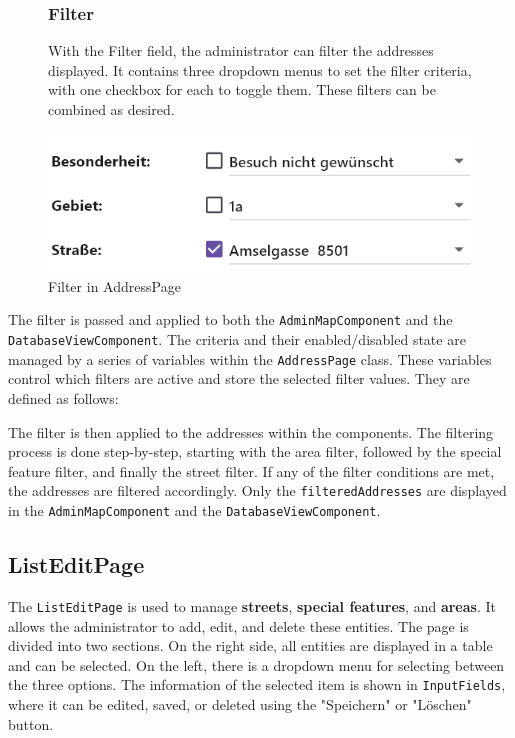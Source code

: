 \begin{figure}[H]
    \centering
    \begin{minipage}{0.55\textwidth} %
        \subsubsection{Filter}
        With the Filter field, the administrator can filter the addresses displayed. It contains three dropdown menus to set the filter criteria, with one checkbox for each to toggle them. These filters can be combined as desired. 
    \end{minipage}
    \hfill 
    \begin{minipage}{0.4\textwidth} %
        \centering
        \includegraphics[width=\linewidth]{images/AdminPanel/FilterField.png}
        \caption{Filter in AddressPage}
        \label{fig:adminpanel_filter}
    \end{minipage}
\end{figure}

\newpage

The filter is passed and applied to both the \texttt{AdminMapComponent} and the \texttt{DatabaseViewComponent}. The criteria and their enabled/disabled state are managed by a series of variables within the \texttt{AddressPage} class. These variables control which filters are active and store the selected filter values. They are defined as follows:\blankLine

The filter is then applied to the addresses within the components. The filtering process is done step-by-step, starting with the area filter, followed by the special feature filter, and finally the street filter. If any of the filter conditions are met, the addresses are filtered accordingly. Only the \texttt{filteredAddresses} are displayed in the \texttt{AdminMapComponent} and the \texttt{DatabaseViewComponent}.
 

\subsection{ListEditPage}
The \texttt{ListEditPage} is used to manage \textbf{streets}, \textbf{special features}, and \textbf{areas}. It allows the administrator to add, edit, and delete these entities. The page is divided into two sections. On the right side, all entities are displayed in a table and can be selected. On the left, there is a dropdown menu for selecting between the three options. The information of the selected item is shown in \texttt{InputFields}, where it can be edited, saved, or deleted using the "Speichern" or "Löschen" button.

